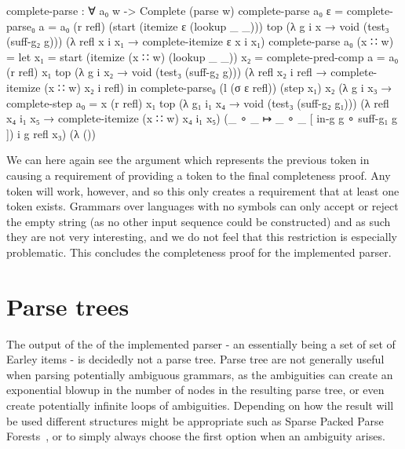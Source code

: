 		\begin{code}
			complete-parse : ∀ a₀ w ->
			  Complete (parse w)
			complete-parse a₀ ε =
			  complete-parse₀ {a = a₀} (r refl) (start (itemize ε (lookup _ _))) top
			    (λ {g i x → void (test₃ (suff-g₂ g))})
			    (λ {refl x i x₁ → complete-itemize ε x i x₁})
			complete-parse a₀ (x ∷ w) =
			  let
			    x₁ = start (itemize (x ∷ w) (lookup _ _))
			    x₂ = complete-pred-comp {a = a₀} (r refl) x₁ top
			      (λ {g i x₂ → void (test₃ (suff-g₂ g))})
			      (λ {refl x₂ i refl → complete-itemize (x ∷ w) x₂ i refl})
			  in
			  complete-parse₀ (l (σ ε refl)) (step x₁) x₂
			    (λ g i x₃ → complete-step {a₀ = x} (r refl) x₁ top
			      (λ {g₁ i₁ x₄ → void (test₃ (suff-g₂ g₁))})
			      (λ {refl x₄ i₁ x₅ → complete-itemize (x ∷ w) x₄ i₁ x₅})
			      (_ ∘ _ ↦ _ ∘ _ [ in-g g ∘ suff-g₁ g ]) i g refl x₃)
			    (λ ())
		\end{code}

		We can here again see the argument  which represents the
		previous token in  causing a requirement of
		providing a token to the final completeness proof. Any token will work,
		however, and so this only creates a requirement that at least one token
		exists. Grammars over languages with no symbols can only accept or
		reject the empty string (as no other input sequence could be
		constructed) and as such they are not very interesting, and we do not
		feel that this restriction is especially problematic. This concludes
		the completeness proof for the implemented parser.

	\section{Parse trees}

		The output of the of the implemented parser - an 
		essentially being a set of set of Earley items - is decidedly not a
		parse tree.  Parse tree are not generally useful when parsing
		potentially ambiguous grammars, as the ambiguities can create an
		exponential blowup in the number of nodes in the resulting parse tree,
		or even create potentially infinite loops of ambiguities. Depending on
		how the result will be used different structures might be appropriate
		such as Sparse Packed Parse Forests~\cite{?}, or to simply always
		choose the first option when an ambiguity arises.
